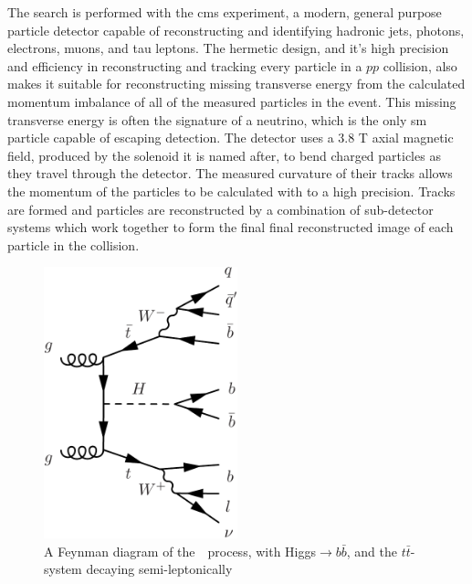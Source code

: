 \par The search is performed with the \acrshort{cms} experiment, a modern, general purpose particle detector capable of reconstructing and identifying hadronic jets, photons, electrons, muons, and tau leptons.  The hermetic design, and it's high precision and efficiency in reconstructing and tracking every particle in a $pp$ collision, also makes it suitable for reconstructing missing transverse energy from the calculated momentum imbalance of all of the measured particles in the event.  This missing transverse energy is often the signature of a neutrino, which is the only \acrshort{sm} particle capable of escaping detection.  The detector uses a 3.8 T axial magnetic field, produced by the solenoid it is named after, to bend charged particles as they travel through the detector.  The measured curvature of their tracks allows the momentum of the particles to be calculated with to a high precision.  Tracks are formed and particles are reconstructed by a combination of sub-detector systems which work together to form the final final reconstructed image of each particle in the collision.  

\begin{figure}[h]
   \centering
  \includegraphics[width=0.5\textwidth]{Figures/Feynman_Diagrams/higgs_production__tth_semileptonic.pdf}
  \caption{A Feynman diagram of the~\ttH~process, with Higgs$\rightarrow$$b\bar{b}$, and the $t\bar{t}$-system decaying semi-leptonically} \label{fd:ttH_semiLep}
\end{figure}

